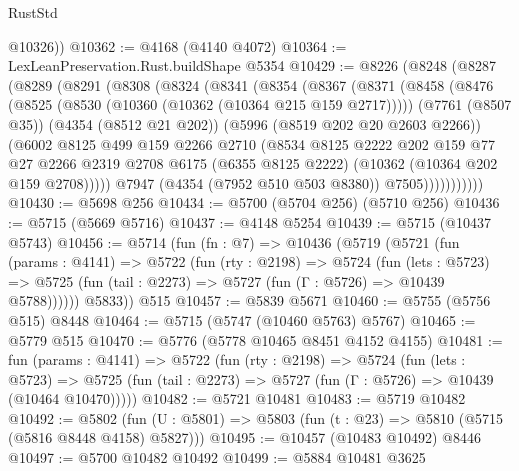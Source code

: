 \begin{lexlean}{RustStd}
\begin{coremodule}
        @10326))
@10362 := @4168 (@4140 @4072)
@10364 := LexLeanPreservation.Rust.buildShape @5354
@10429 := @8226
    (@8248
      (@8287
        (@8289
          (@8291
            (@8308
              (@8324
                (@8341
                  (@8354
                    (@8367
                      (@8371
                        (@8458
                          (@8476
                            (@8525 (@8530 (@10360 (@10362 (@10364 @215 @159 @2717)))))
                            (@7761 (@8507 @35))
                            (@4354 (@8512 @21 @202))
                            (@5996 (@8519 @202 @20 @2603 @2266))
                            (@6002
                              @8125
                              @499
                              @159
                              @2266
                              @2710
                              (@8534
                                @8125
                                @2222
                                @202
                                @159
                                @77
                                @27
                                @2266
                                @2319
                                @2708
                                @6175
                                (@6355 @8125 @2222)
                                (@10362 (@10364 @202 @159 @2708)))))
                          @7947
                          (@4354 (@7952 @510 @503 @8380))
                          @7505)))))))))))
@10430 := @5698 @256
@10434 := @5700 (@5704 @256) (@5710 @256)
@10436 := @5715 (@5669 @5716)
@10437 := @4148 @5254
@10439 := @5715 (@10437 @5743)
@10456 := @5714
    (fun (fn : @7) =>
    @10436
      (@5719
        (@5721
          (fun (params : @4141) =>
          @5722
            (fun (rty : @2198) =>
            @5724
              (fun (lets : @5723) =>
              @5725 (fun (tail : @2273) => @5727 (fun (Γ : @5726) => @10439 @5788))))))
        @5833))
    @515
@10457 := @5839 @5671
@10460 := @5755 (@5756 @515) @8448
@10464 := @5715 (@5747 (@10460 @5763) @5767)
@10465 := @5779 @515
@10470 := @5776 (@5778 @10465 @8451 @4152 @4155)
@10481 := fun (params : @4141) =>
  @5722
    (fun (rty : @2198) =>
    @5724
      (fun (lets : @5723) =>
      @5725 (fun (tail : @2273) => @5727 (fun (Γ : @5726) => @10439 (@10464 @10470)))))
@10482 := @5721 @10481
@10483 := @5719 @10482
@10492 := @5802
    (fun (U : @5801) => @5803 (fun (t : @23) => @5810 (@5715 (@5816 @8448 @4158) @5827)))
@10495 := @10457 (@10483 @10492) @8446
@10497 := @5700 @10482 @10492
@10499 := @5884 @10481 @3625

\end{coremodule}
\end{lexlean}

